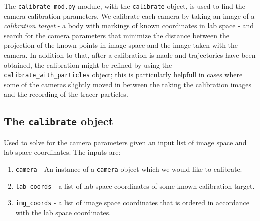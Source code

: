 \documentclass[10pt,a4paper]{article}
\begin{document}
The \texttt{calibrate\_mod.py} module, with the \texttt{calibrate} object, is used to find the camera calibration parameters. We calibrate each camera by taking an image of a \textit{calibration target} - a body with markings of known coordinates in lab space - and search for the camera parameters that minimize the distance between the projection of the known points in image space and the image taken with the camera. In addition to that, after a calibration is made and trajectories have been obtained, the calibration might be refined by using the \texttt{calibrate\_with\_particles} object; this is particularly helpfull in cases where some of the cameras slightly moved in between the taking the calibration images and the recording of the tracer particles.



\subsection{The \texttt{calibrate} object}\label{sec:calibrate_obj}

Used to solve for the camera parameters given an input list of image space and lab space coordinates. The inputs are:

\begin{enumerate}
	\item \texttt{camera} - An instance of a \texttt{camera} object which we would like to calibrate.
	\item \texttt{lab\_coords} - a list of lab space coordinates of some known calibration target. 
	\item \texttt{img\_coords} - a list of image space coordinates that is ordered in accordance with the lab space coordinates. 
\end{enumerate}
\end{document}
